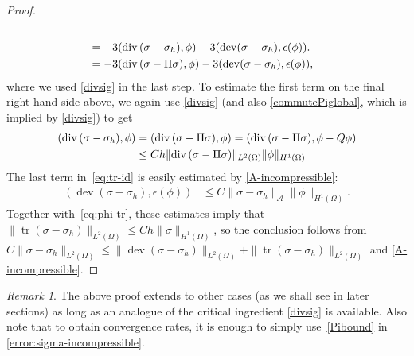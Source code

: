 \documentclass[12pt]{amsart}
\numberwithin{equation}{section}
\DeclareMathOperator{\dev}{dev}
\theoremstyle{definition}
\theoremstyle{remark}
\newtheorem{remark}[theorem]{Remark}
\renewcommand{\(}{\bigl(}
\renewcommand{\)}{\bigr)}
\newcommand\tr{\operatorname{tr}}
\newcommand{\dive}{{\ensuremath\mathop{\mathrm{div}\,}}} %
\newcommand{\Aa}{\mathcal{A}}
\newcommand{\revj}[1]{{\color{black}#1}}
\begin{document}
\begin{proof}
\begin{equation}
\begin{aligned}
  \\ %
  &= \revj{-} 3(\dive (\sigma - {\sigma}_h),  \phi) - 3
    (\dev(\sigma - {\sigma}_h), \epsilon(\phi)). 
  \\ 
  &= \revj{-} 3(\dive (\sigma - \Pi \sigma), \phi) - 3
    (\dev(\sigma - {\sigma}_h), \epsilon(\phi)),
\end{aligned}
\end{equation}
where we used \eqref{divsig} in the last step.
To estimate the first term on the final right hand side above, we again use  \eqref{divsig}
(and also \eqref{commutePiglobal}, which is implied by  \eqref{divsig}) to get 
\begin{align}
  \label{eq:incompressible-div}
  (\dive (\sigma - {\sigma}_h),  \phi)
  &= ( \dive (\sigma - \Pi \sigma) , \phi) %
    = (\dive (\sigma - \Pi \sigma), \phi - Q \phi) %
  \\
  \notag
                                                       &\le Ch \|\dive (\sigma - \Pi \sigma)\|_{L^2(\Omega)} \|\phi\|_{H^1(\Omega)}
\end{align}
The last term in~\eqref{eq:tr-id} is easily estimated by
\eqref{A-incompressible}:
\begin{align*}
  ( \dev(\sigma - {\sigma}_h), \epsilon(\phi))
  &\le
    C\| \sigma - {\sigma}_h\|_{\Aa} \| \phi \|_{H^1(\Omega)}.%
\end{align*}
Together with~\eqref{eq:phi-tr}, 
these estimates imply  that  $\|\tr(\sigma - {\sigma}_h)\|_{L^2(\Omega)} \le Ch \|\sigma\|_{H^1(\Omega)}$, so the conclusion follows from 
$C\|\sigma - \sigma_h\|_{L^2(\Omega)} \le
\|\dev (\sigma - \sigma_h)\|_{L^2(\Omega)}
    + \| \tr(\sigma - \sigma_h) \|_{L^2(\Omega)}$ and
\eqref{A-incompressible}.
\end{proof}

\begin{remark} \label{rem:incomproofcritical}
  The above  proof extends to other cases (as we shall see in later sections)
  as long as an analogue of 
  the critical ingredient \eqref{divsig} is available.
  Also note that to obtain convergence
  rates, it is enough to simply use~\eqref{Pibound} in
  \eqref{error:sigma-incompressible}.
\end{remark}
\end{document}
